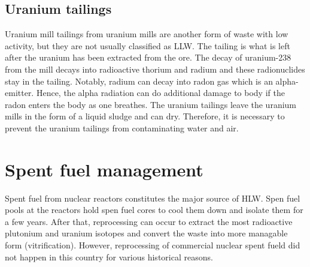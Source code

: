 \documentclass[nofootinbib,preprint,aip,pra]{revtex4-1}
\begin{document}
    \subsection{Uranium tailings}
    Uranium mill tailings from uranium mills are another form of waste with low activity, but
    they are not usually classified as LLW. The tailing is what is left after the uranium has been
    extracted from the ore. The decay of uranium-238 from the mill decays into
    radioactive thorium and radium and these radionuclides stay in the tailing. Notably, radium
    can decay into radon gas which is an alpha-emitter. Hence, the alpha radiation can do additional
    damage to body if the radon enters the body as one breathes.
    The uranium tailings leave the uranium mills in the form of a liquid sludge
    and can dry. Therefore, it is necessary to prevent the uranium tailings
    from contaminating water and air.
    
    \section{Spent fuel management}
    \label{sec:temp}
    Spent fuel from nuclear reactors constitutes the major source of HLW. Spen fuel pools at the
    reactors hold spen fuel cores to cool them down and isolate them for a few years. After that,
    reprocessing can occur to extract the most radioactive plutonium and uranium isotopes and
    convert the waste into more managable form (vitrification). However, reprocessing of commercial
    nuclear spent fueld did not
    happen in this country for various historical reasons. 
\end{document}
